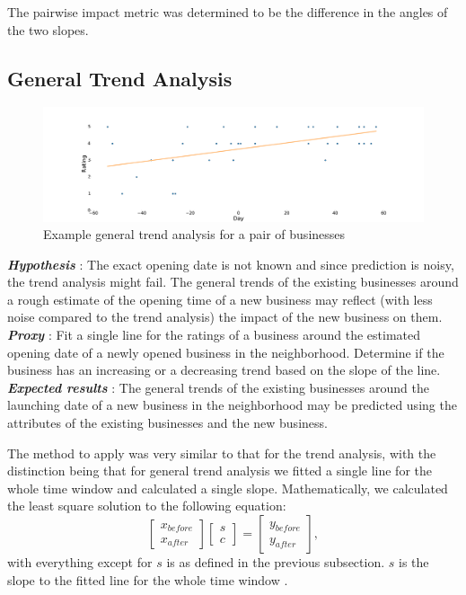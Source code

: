 \documentclass{vldb}
\begin{document}
The pairwise impact metric was determined to be the difference in the angles of the two slopes. 

\subsection*{General Trend Analysis}

\begin{figure}[h]
\centering
\includegraphics[width=\columnwidth]{gen_trend.pdf}
\caption{   Example general trend analysis for a pair of businesses}
\end{figure}

\textbf{\textit{Hypothesis}} : The exact opening date is not known and since prediction is noisy, the trend analysis might fail. The general trends of the existing businesses around a rough estimate of the opening time of a new business may reflect (with less noise compared to the trend analysis) the impact of the new business on them.\\
\textbf{\textit{Proxy}} : Fit a single line for the ratings of a business around the estimated opening date of a newly opened business in the neighborhood. Determine if the business has an increasing or a decreasing trend based on the slope of the line.\\
\textbf{\textit{Expected results}} : The general trends of the existing businesses around the launching date of a new business in the neighborhood may be predicted using the attributes of the existing businesses and the new business. 

The method to apply was very similar to that for the trend analysis, with the distinction being that for general trend analysis we fitted a single line for the whole time window and calculated a single slope. Mathematically, we calculated the least square solution to the following equation:
\begin{equation*}
 \left [\begin{array}{c}x_{before} \\ x_{after}  \end{array} \right ] 
  \left [\begin{array}{c}s \\ c \end{array} \right ] 
 =  \left [\begin{array}{c}y_{before} \\ y_{after} \end{array} \right ] ,
\end{equation*}
with everything except for $s$ is as defined in the previous subsection. $s$ is the slope to the fitted line for the whole time window .
\end{document}
